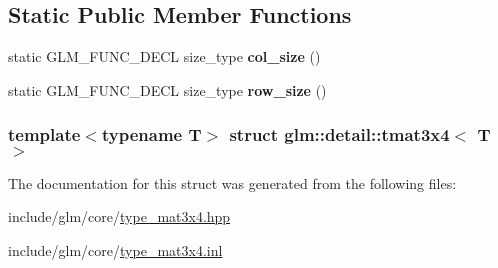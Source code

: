 \subsection*{\-Static \-Public \-Member \-Functions}
\begin{DoxyCompactItemize}
\item 
\hypertarget{structglm_1_1detail_1_1tmat3x4_a9c3d97c02718f4e9a45cabe4e2ef1fe9}{static \-G\-L\-M\-\_\-\-F\-U\-N\-C\-\_\-\-D\-E\-C\-L size\-\_\-type {\bfseries col\-\_\-size} ()}\label{structglm_1_1detail_1_1tmat3x4_a9c3d97c02718f4e9a45cabe4e2ef1fe9}

\item 
\hypertarget{structglm_1_1detail_1_1tmat3x4_a36158f36742dc0754be50ef176491759}{static \-G\-L\-M\-\_\-\-F\-U\-N\-C\-\_\-\-D\-E\-C\-L size\-\_\-type {\bfseries row\-\_\-size} ()}\label{structglm_1_1detail_1_1tmat3x4_a36158f36742dc0754be50ef176491759}

\end{DoxyCompactItemize}
\subsubsection*{template$<$typename \-T$>$ struct glm\-::detail\-::tmat3x4$<$ T $>$}



\-The documentation for this struct was generated from the following files\-:\begin{DoxyCompactItemize}
\item 
include/glm/core/\hyperlink{type__mat3x4_8hpp}{type\-\_\-mat3x4.\-hpp}\item 
include/glm/core/\hyperlink{type__mat3x4_8inl}{type\-\_\-mat3x4.\-inl}\end{DoxyCompactItemize}
